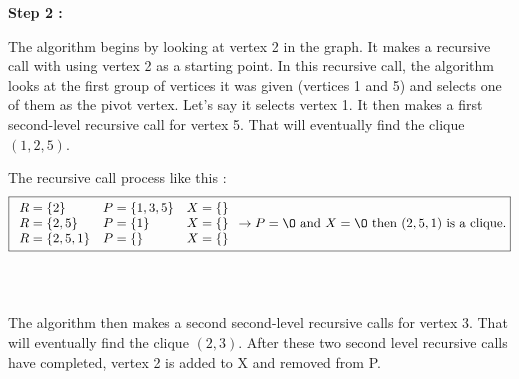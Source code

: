\hspace*{1cm}  \textbf{Step 2 :}
\\
\begin{minipage}{0.4\textwidth}
\end{minipage}
\begin{minipage}{0.6\textwidth}
    The algorithm begins by looking at vertex 2 in the graph. It makes a recursive call with using vertex 2 as a starting point. In this recursive call, the algorithm looks at the first group of vertices it was given (vertices 1 and 5) and selects one of them as the pivot vertex. Let's say it selects vertex 1. It then makes a first second-level recursive call for vertex 5. That will eventually find the clique $(1,2,5)$.
\end{minipage}
The recursive call process like this  :
$$ \boxed{
        \begin{array}{lll}
            R = \{2\}     & P = \{1,3,5\} & X = \{\} \\
            R = \{2,5\}   & P = \{1\}     & X = \{\} \\
            R = \{2,5,1\} & P = \{\}      & X = \{\} \\
        \end{array}
        \rightarrow P = \O \text{ and } X = \O \text{ then } (2,5,1) \text{ is a clique.}
    }$$
\\
\\
\begin{minipage}{0.4\textwidth}
\end{minipage}
\begin{minipage}{0.6\textwidth}
    The algorithm then makes a second second-level recursive calls for vertex 3. That will eventually find the clique $(2,3)$. After these two second level recursive calls have completed, vertex 2 is added to X and removed from P.
\end{minipage}
